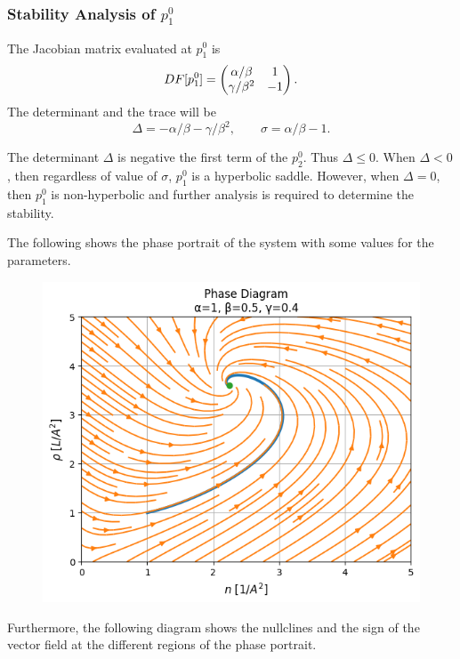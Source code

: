 \subsubsection{Stability Analysis of $p^0_1$}
The Jacobian matrix evaluated at $p^0_1$ is
\[ DF[p^0_1] = \begin{pmatrix} \alpha/\beta & 1 \\ \gamma/\beta^2 & -1 \end{pmatrix}. \]
The determinant and the trace will be
\[  \Delta = -\alpha/\beta - \gamma/\beta^2, \qquad \sigma = \alpha/\beta-1. \]
\begin{observation}
	The determinant $\Delta$ is negative the first term of the $p^0_2$. Thus $\Delta\leq0$. When $\Delta<0$, then regardless of value of $\sigma$, $p^0_1$ is a hyperbolic saddle. However, when $\Delta=0$, then $p^0_1$ is non-hyperbolic and further analysis is required to determine the stability.
\end{observation}
The following shows the phase portrait of the system with some values for the parameters.
\begin{figure}[h!]
	\centering
	\includegraphics[width=0.5\linewidth]{images/simpleODEModel1PhasePortrait}

	\label{fig:simpleodemodel1phaseportrait}
\end{figure}


Furthermore, the following diagram shows the nullclines and the sign of the vector field at the different regions of the phase portrait.

\FloatBarrier



